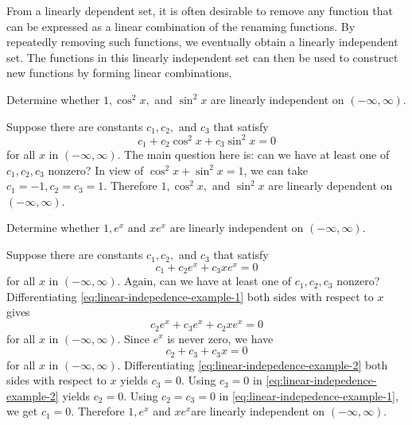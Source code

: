 From a linearly dependent set, it is often desirable to remove any function that can be expressed as a linear combination of the renaming functions.  By repeatedly removing such functions, we eventually obtain a linearly independent set. The functions in this linearly independent set can then be used to construct new functions by forming linear combinations.



\begin{example}\label{ex:test-for-indepedence-1} 
Determine whether $1, \cos^2x,$ and $\sin^2x$ are linearly independent on \((-\infty, \infty).\)
\end{example}
\begin{solution}
	Suppose there are constants $c_1, c_2,$ and $ c_3$ that satisfy 
	\[c_1 + c_2\cos^2x + c_3\sin^2x=0\] for all $x$ in $(-\infty, \infty).$ The main question here is: can we have at least one of $c_1, c_2, c_3$ nonzero? In view of $\cos^2 x+ \sin^2 x=1$, we can take $c_1 = -1, c_2=c_3 =1.$  Therefore $1, \cos^2x,$ and $\sin^2x$ are linearly dependent on \((-\infty, \infty).\)
	\end{solution}
	
	
\begin{example}\label{ex:test-for-indepedence-2} 
	Determine whether $1, e^{x}$ and $x e^{x}$ are linearly independent on \((-\infty, \infty).\)
\end{example}
\begin{solution}
	Suppose there are constants $c_1, c_2,$ and $ c_3$ that satisfy 
	\begin{equation}\label{eq:linear-indepedence-example-1}
		c_1 + c_2e^x + c_3 xe^x=0
	\end{equation} for all $x$ in $(-\infty, \infty).$ Again, can we have at least one of $c_1, c_2, c_3$ nonzero? Differentiating \eqref{eq:linear-indepedence-example-1} both sides with respect to $x$ gives
	\[	c_2e^x + c_3 e^x+ c_2 x e^x=0\]
 for all $x$ in $(-\infty, \infty).$ Since $e^x$ is never zero,
 we have \begin{equation}\label{eq:linear-indepedence-example-2}
 	c_2 + c_3 + c_3 x =0
 \end{equation}
 for all $x$ in $(-\infty, \infty).$ Differentiating \eqref{eq:linear-indepedence-example-2} both sides with respect to $x$ yields \(c_3=0.\)
	   Using $c_3=0$ in \eqref{eq:linear-indepedence-example-2} yields  $c_2 = 0.$ Using $c_2=c_3=0$ in \eqref{eq:linear-indepedence-example-1}, we get $c_1=0.$ Therefore $1, e^{x}$ and $x e^{x}$are linearly independent on \((-\infty, \infty).\) 
\end{solution}


